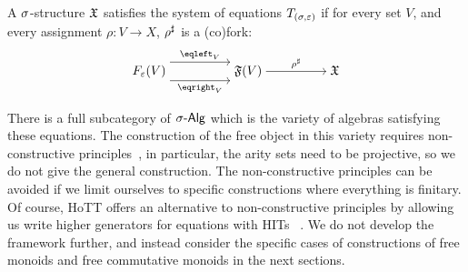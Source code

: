 \begin{definition}
    A $\sigma$-structure $\mathfrak{X}$ satisfies the system of equations $T_{(\sigma,\varepsilon)}$ if for every set $V$,
    and every assignment $\rho : V \to X$, ${\rho}^{\sharp}$ is a (co)fork:
    \[\begin{tikzcd}[ampersand replacement=\&,cramped]
            {\EqSig(V)} \&\& {\str{F}(V)} \&\& {\str{X}}
            \arrow["{\ext{\rho}}", from=1-3, to=1-5]
            \arrow["{\eqleft_{V}}", shift left=3, from=1-1, to=1-3]
            \arrow["{\eqright_{V}}"', shift right=3, from=1-1, to=1-3]
        \end{tikzcd}\]
\end{definition}

There is a full subcategory of $\sigAlg$ which is the variety of algebras satisfying these equations.
%
The construction of the free object in this variety requires non-constructive principles~\cite[Section 7, pg 142]{blassWordsFreeAlgebras1983},
in particular, the arity sets need to be projective, so we do not give the general construction.
%
The non-constructive principles can be avoided if we limit ourselves to specific constructions
where everything is finitary.
%
Of course, HoTT offers an alternative to non-constructive principles by allowing us
write higher generators for equations with HITs
~\cite{univalentfoundationsprogramHomotopyTypeTheory2013}.
%
We do not develop the framework further, and instead consider the specific cases of constructions of free monoids and free commutative monoids in the next sections.
